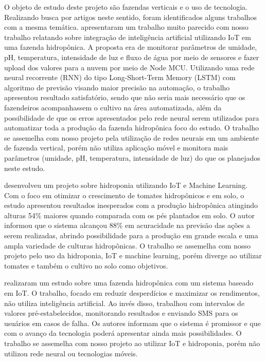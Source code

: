 O objeto de estudo deste projeto são fazendas verticais e o uso de tecnologia. Realizando busca por artigos neste sentido, foram identificados alguns trabalhos com a mesma temática. \citet{saraswathy2020} apresentaram um trabalho muito parecido com nosso trabalho relatando sobre integração de inteligência artificial utilizando IoT em uma fazenda hidropônica. A proposta era de monitorar parâmetros de umidade, pH, temperatura, intensidade de luz e fluxo de água por meio de sensores e fazer upload dos valores para a nuvem por meio de Node MCU. Utilizando uma rede neural recorrente (RNN) do tipo Long-Short-Term Memory (LSTM) com algoritmo de previsão visando maior precisão na automação, o trabalho apresentou resultado satisfatório, sendo que não seria mais necessário que os fazendeiros acompanhassem o cultivo na área automatizada, além da possibilidade de que os erros apresentados pelo rede neural serem utilizados para automatizar toda a produção da fazenda hidropônica foco do estudo. O trabalho se assemelha com nosso projeto pela utilização de redes neurais em um ambiente de fazenda vertical, porém não utiliza aplicação móvel e monitora mais parâmetros (umidade, pH, temperatura, intensidade de luz) do que os planejados neste estudo.

\citet{phukan2022} desenvolveu um projeto sobre hidroponia utilizando IoT e Machine Learning. Com o foco em otimizar o crescimento de tomates hidropônicos e em solo, o estudo apresentou resultados inesperados com a produção hidropônica atingindo alturas 54\% maiores quando comparada com os pés plantados em solo. O autor informou que o sistema alcançou 88\% em acuracidade na previsão das ações a serem realizadas, abrindo possibilidade para a produção em grande escala e uma ampla variedade de culturas hidropônicas. O trabalho se assemelha com nosso projeto pelo uso da hidroponia, IoT e machine learning, porém diverge ao utilizar tomates e também o cultivo no solo como objetivos.

\citet{suresh2024} realizaram um estudo sobre uma fazenda hidropônica com um sistema baseado em IoT. O trabalho, focado em reduzir desperdícios e maximizar os rendimentos, não utiliza inteligência artificial. Ao invés disso, trabalhou com intervalos de valores pré-estabelecidos, monitorando resultados e enviando SMS para os usuários em casos de falha. Os autores informam que o sistema é promissor e que com o avanço da tecnologia poderá apresentar ainda mais possibilidades. O trabalho se assemelha com nosso projeto ao utilizar IoT e hidroponia, porém não utilizou rede neural ou tecnologias móveis.